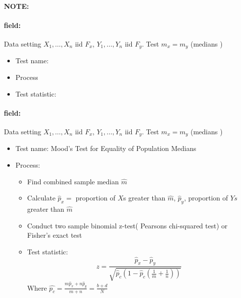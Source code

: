 \documentclass[12pt]{article}
\newenvironment{note}{\paragraph{NOTE:}}{}
\newenvironment{field}{\paragraph{field:}}{}
\begin{document}
\begin{note}
  \begin{field}
    Data setting $X_1, \ldots , X_n$ iid $F_x$, $Y_1, \ldots, Y_n$ iid $F_y$. Test $m_x = m_y$ (medians )
    \begin{itemize}
      \item Test name:
      \item Process
      \item Test statistic:
    \end{itemize}
  \end{field}
  \begin{field}
    Data setting $X_1, \ldots , X_n$ iid $F_x$, $Y_1, \ldots, Y_n$ iid $F_y$. Test $m_x = m_y$ (medians )
    \begin{itemize}
      \item Test name: Mood's Test for Equality of Population Medians
      \item Process:
      \begin{itemize}
        \item Find combined sample median $\hat{m}$
        \item Calculate $\hat{p}_x = $ proportion of $X$s greater than $\hat{m}$, $\hat{p}_y$, proportion of $Ys$ greater than $\hat{m}$
        \item Conduct two sample binomial z-test( Pearsons chi-squared test) or Fisher's exact test
        \item  Test statistic: $$ z = \frac{\hat{p}_x - \hat{p}_y}{\sqrt{\hat{p}_c(1 - \hat{p}_c(\frac{1}{m} + \frac{1}{n}))}} $$ Where $\hat{p_c} = \frac{m\hat{p}_x + n\hat{p}_y}{m+n} = \frac{b + d}{N}$
      \end{itemize}
    \end{itemize}
  \end{field}
\end{note}
\end{document}
